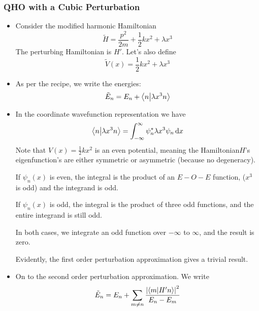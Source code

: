 \documentclass[11pt, a4paper]{article}
\newcommand{\diff}{\mathop{}\!\mathrm{d}} %
\newcommand{\pert}{perturbation\xspace}
\newcommand{\Ham}{Hamiltonian\xspace}
\renewcommand{\t}[1]{\tilde{#1}}
\begin{document}
\subsubsection{QHO with a Cubic Perturbation}
\begin{itemize}
	\item Consider the modified harmonic \Ham 
	\begin{equation*}
		\t{H} = \frac{p^{2}}{2m} + \frac{1}{2}kx^{2} + \lambda x^{3}
	\end{equation*}
	The perturbing \Ham is $ H' $. Let's also define
	\begin{equation*}
		\t{V}(x) = \frac{1}{2}kx^{2} + \lambda x^{3}
	\end{equation*}
	
	\item As per the recipe, we write the energies:
	\begin{equation*}
		\t{E}_{n} = E_{n} + \braket{n}{\lambda x^{3}n}
	\end{equation*}
	
	\item In the coordinate wavefunction representation we have
	\begin{equation*}
		\braket{n}{\lambda x^{3}n} = \int_{-\infty}^{\infty}\psi_{n}^{*}\lambda x^{3}\psi_{n}\diff x
	\end{equation*}
	Note that $ V(x) = \frac{1}{2}kx^{2} $ is an even potential, meaning the \Ham $ H $'s eigenfunction's are either symmetric or asymmetric (because no degeneracy).
	
	If $ \psi_{n}(x) $ is even, the integral is the product of an $ E-O-E $ function, ($ x^{3} $ is odd) and the integrand is odd.
	
	If $ \psi_{n}(x) $ is odd, the integral is the product of three odd functions, and the entire integrand is still odd. 
	
	In both cases, we integrate an odd function over $ -\infty $ to $ \infty $, and the result is zero. 
	
	Evidently, the first order \pert approximation gives a trivial result.
	
	\item On to the second order \pert approximation. We write
	\begin{equation*}
		\t{E}_{n} = E_{n} + \sum_{m \neq n} \frac{\abs{\braket{m}{H'n}}^{2}}{E_{n} - E_{m}}
	\end{equation*}
	

\end{itemize}
\end{document}
